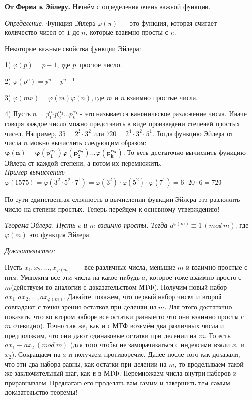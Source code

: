 \newpage

\hspace{3mm}

\textbf{\Large{От Ферма к Эйлеру.}} Начнём с определения очень важной функции. 

\textit{Определение.} Функция Эйлера $\varphi (n) \ - $ это функция, которая считает количество чисел от $1$ до $n$, которые взаимно просты с $n$. 

\par 

Некоторые важные свойства функции Эйлера:

1) $\varphi (p) = p-1$, где $p$ простое число.

2) $\varphi (p^{n}) = p^{n}- p^{n-1}$ 

3) $\varphi (mn) = \varphi (m)\varphi (n)$, где $m$ и $n$ взаимно простые числа.

4) Пусть $n = p_1^{\alpha_1}p_2^{\alpha_2} \dots p_k^{\alpha_k}$ - это называется каноническое разложение числа. Иначе говоря каждое число можно представить в виде произведени степеней простых чисел. Например, $36 = 2^2 \cdot 3^2$ или $720 = 2^4 \cdot 3^2 \cdot 5^1$. Тогда функцию Эйлера от числа $n$ можно вычислить следующим образом: 
$\boldsymbol{\varphi (n) = \varphi (p_1^{\alpha_1}) \varphi (p_2^{\alpha_2}) \dots \varphi (p_k^{\alpha_k})}$. То есть достаточно вычислить функцию Эйлера от каждой степени, а потом их перемножить. \\
\textit{Пример вычисления:}
$\varphi (1575) = \varphi (3^2 \cdot 5^2 \cdot 7^1) = \varphi (3^2) \cdot \varphi (5^2) \cdot \varphi (7^1) = 6 \cdot 20 \cdot 6 = 720$

По сути единственная сложность в вычислении функции Эйлера это разложить число на степени простых. Теперь перейдем к основному утверждению!

\textit{Теорема Эйлера. Пусть $a$ и $m$ взаимно просты. Тогда $a^{\varphi (m)} \equiv 1 \ (mod \ m)$}, где $\varphi (m)$ это функция Эйлера.

\par 

\textit{Доказательство:}

Пусть $x_1, x_2, \dots, x_{\varphi (m)} \ - $ все различные числа, меньшие $m$ и взаимно простые с ним. Умножим все эти числа на какое-нибудь $a$, которое тоже взаимно просто с $m$(действуем по аналогии с доказательством МТФ). Получим новый набор $ax_1, ax_2, \dots, ax_{\varphi (m)}$. Давайте покажем, что первый набор чисел и второй совпадают с точки зрения остатков при делении на $m$. Для этого достаточно показать, что во втором наборе все остатки разные(то что они взаимно просты с $m$ очевидно). Точно так же, как и с МТФ возьмём два различных числа и предположим, что они дают одинаковые остатки при делении на $m$. То есть $ax_1 \equiv ax_2 \ (mod \ m)$ (для того чтобы не заморачиваться с индексами взяли $x_1$ и $x_2$). Сокращаем на $a$ и получаем противоречие. Далее после того как доказали, что эти два набора равны, как остатки при делении на $m$, то проделываем такой же заключительный шаг, как и в МТФ. Перемножаем числа внутри наборов и приравниваем. Предлагаю его  проделать вам самим и завершить тем самым доказательство теоремы!

